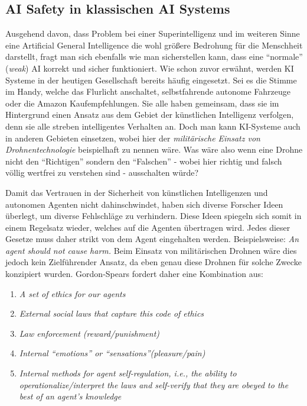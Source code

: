         \subsection{AI Safety in klassischen AI Systems}

        Ausgehend davon, dass Problem bei einer Superintelligenz und im weiteren Sinne eine Artificial General
        Intelligence die wohl größere Bedrohung für die Menschheit darstellt, fragt man sich ebenfalls wie man
        sicherstellen kann, dass eine ``normale'' (\textit{weak}) AI korrekt und sicher funktioniert. Wie schon
        zuvor erwähnt, werden KI Systeme in der heutigen Gesellschaft bereits häufig eingesetzt. Sei es die
        Stimme im Handy, welche das Flurlicht anschaltet, selbstfahrende autonome Fahrzeuge oder die Amazon
        Kaufempfehlungen. Sie alle haben gemeinsam, dass sie im Hintergrund einen Ansatz aus dem Gebiet der künstlichen
        Intelligenz verfolgen, denn sie alle streben intelligentes Verhalten an. Doch man kann KI-Systeme auch in
        anderen Gebieten einsetzen, wobei hier der \textit{militärische Einsatz von Drohnentechnologie} beispielhaft
        zu nennen wäre. \cite[s. 251]{Stulpe2018} Was wäre also wenn eine Drohne nicht den ``Richtigen'' sondern den
        ``Falschen'' - wobei hier richtig und falsch völlig wertfrei zu verstehen sind - ausschalten würde?

        Damit das Vertrauen in der Sicherheit von künstlichen Intelligenzen und autonomen Agenten nicht dahinschwindet,
        haben sich diverse Forscher Ideen überlegt, um diverse Fehlschläge zu verhindern.\cite[s. 257]{GordonSpears2003}
        Diese Ideen spiegeln sich somit in einem Regelsatz wieder, welches auf die Agenten übertragen wird. Jedes dieser
        Gesetze muss daher strikt von dem Agent eingehalten werden. Beispielsweise:
        \textit{An agent should not cause harm.} Beim Einsatz von militärischen Drohnen wäre dies jedoch kein
        Zielführender Ansatz, da eben genau diese Drohnen für solche Zwecke konzipiert wurden. Gordon-Spears fordert daher
        eine Kombination aus:

        \begin{enumerate}
            \item \textit{A set of ethics for our agents}
            \item \textit{External social laws that capture this code of ethics}
            \item \textit{Law enforcement (reward/punishment)}
            \item \textit{Internal ``emotions'' or ``sensations''(pleasure/pain)}
            \item \textit{Internal methods for agent self-regulation, i.e., the ability to operationalize/interpret the laws
            and self-verify that they are obeyed to the best of an agent's knowledge}
        \end{enumerate}

